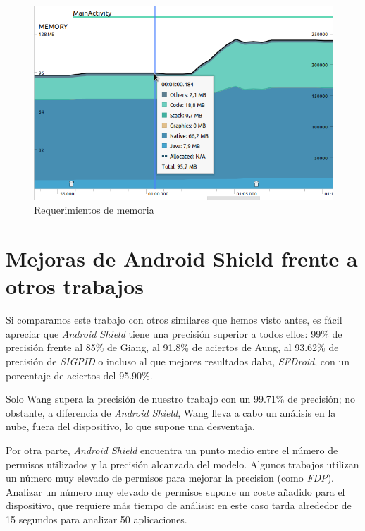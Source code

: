 \begin{figure}[H]
\centering
	\includegraphics[scale=0.5]{img/memory.png}
	\caption{Requerimientos de memoria}
	\label{fig:memory}
\end{figure}

\section{Mejoras de Android Shield frente a otros trabajos}

Si comparamos este trabajo con otros similares que hemos visto antes, es fácil apreciar que \textit{Android Shield} tiene una precisión superior a todos ellos: 99\% de precisión frente al 85\% de Giang\hypersetup{citecolor=red}\cite{giang}, al 91.8\% de aciertos de Aung\hypersetup{citecolor=red}\cite{aung}, al 93.62\% de precisión de \textit{SIGPID}\hypersetup{citecolor=red}\cite{sigpid} o incluso al que mejores resultados daba, \textit{SFDroid}\hypersetup{citecolor=red}\cite{garg}, con un porcentaje de aciertos del 95.90\%.

Solo Wang\hypersetup{citecolor=red}\cite{cloud} supera la precisión de nuestro trabajo con un 99.71\% de precisión; no obstante, a diferencia de \textit{Android Shield}, Wang lleva a cabo un análisis en la nube, fuera del dispositivo, lo que supone una desventaja.

Por otra parte, \textit{Android Shield} encuentra un punto medio entre el número de permisos utilizados y la precisión alcanzada del modelo. Algunos trabajos utilizan un número muy elevado de permisos para mejorar la precision (como \textit{FDP}\hypersetup{citecolor=red}\cite{jiang}). Analizar un número muy elevado de permisos supone un coste añadido para el dispositivo, que requiere más tiempo de análisis: en este caso tarda alrededor de 15 segundos para analizar 50 aplicaciones.


